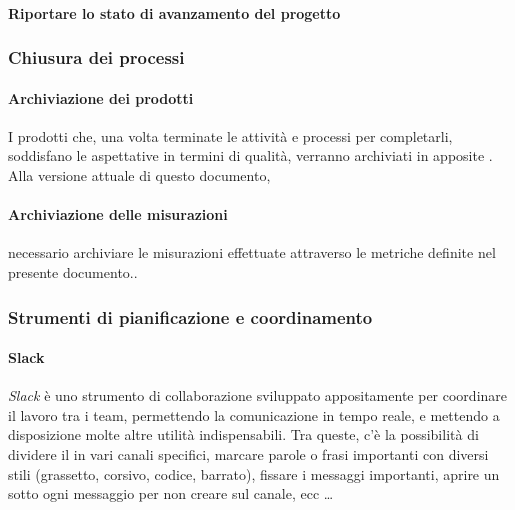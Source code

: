     		\paragraph{Riportare lo stato di avanzamento del progetto}
    		
    		
		\subsubsection{Chiusura dei processi}
		
    		\paragraph{Archiviazione dei prodotti}
			I prodotti che, una volta terminate le attività e processi per completarli, soddisfano le aspettative in termini di qualità,
			verranno archiviati in apposite . Alla versione attuale di questo documento,
    		
    		\paragraph{Archiviazione delle misurazioni} %
    		necessario archiviare le misurazioni effettuate attraverso le metriche definite nel presente documento..
    		
    	\subsubsection{Strumenti di pianificazione e coordinamento}
    	
    		\paragraph{Slack} %
			\emph{Slack} è uno strumento di collaborazione sviluppato appositamente per coordinare il lavoro tra i team, permettendo la comunicazione in tempo
			reale, e mettendo a disposizione molte altre utilità indispensabili. Tra queste, c'è la possibilità di dividere il  in vari canali
			specifici, marcare parole o frasi importanti con diversi stili (grassetto, corsivo, codice, barrato), fissare i messaggi importanti, aprire un 
			sotto ogni messaggio per non creare  sul canale, ecc \dots

